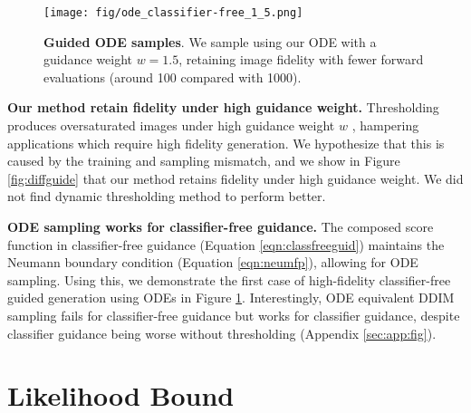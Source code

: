 \documentclass{article}
\theoremstyle{plain}
\theoremstyle{definition}
\theoremstyle{remark}
\begin{document}
\begin{figure}[!h]
    \centering
    \texttt{[image: fig/ode\_classifier-free\_1\_5.png]}
    \caption{\textbf{Guided ODE samples}. We sample using our ODE with a guidance weight $w=1.5$, retaining image fidelity with fewer forward evaluations (around 100 compared with 1000).} \label{fig:odesample}
    \vspace{-5mm}
\end{figure}

\textbf{Our method retain fidelity under high guidance weight.} Thresholding produces oversaturated images under high guidance weight $w$ \citep{Ho2022ClassifierFreeDG, Saharia2022PhotorealisticTD}, hampering applications which require high fidelity generation. We hypothesize that this is caused by the training and sampling mismatch, and we show in Figure \ref{fig:diffguide} that our method retains fidelity under high guidance weight. We did not find dynamic thresholding method to perform better.

\textbf{ODE sampling works for classifier-free guidance.} The composed score function in classifier-free guidance (Equation \ref{eqn:classfreeguid}) maintains the Neumann boundary condition (Equation \ref{eqn:neumfp}), allowing for ODE sampling. Using this, we demonstrate the first case of high-fidelity classifier-free guided generation using ODEs in Figure \ref{fig:odesample}. Interestingly, ODE equivalent DDIM sampling fails for classifier-free guidance but works for classifier guidance, despite classifier guidance being worse without thresholding (Appendix \ref{sec:app:fig}).




 \section{Likelihood Bound}\label{sec:likelihood}
\end{document}
